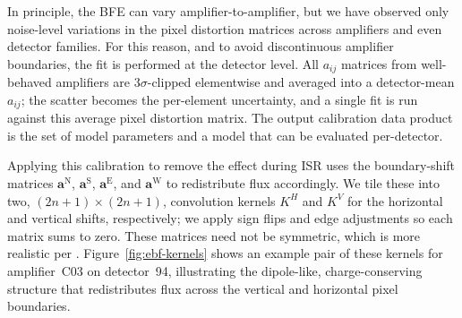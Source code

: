 In principle, the BFE can vary amplifier-to-amplifier, but we have observed only noise-level variations in the pixel distortion matrices across amplifiers and even detector families.
For this reason, and to avoid discontinuous amplifier boundaries, the fit is performed at the detector level.
All $a_{ij}$ matrices from well-behaved amplifiers are 3$\sigma$-clipped elementwise and averaged into a detector-mean $a_{ij}$; the scatter becomes the per-element uncertainty, and a single fit is run against this average pixel distortion matrix.
The output calibration data product is the set of model parameters and a model that can be evaluated per-detector.

Applying this calibration to remove the effect during ISR uses the boundary-shift matrices $\mathbf{a}^{\mathrm{N}}$, $\mathbf{a}^{\mathrm{S}}$, $\mathbf{a}^{\mathrm{E}}$, and $\mathbf{a}^{\mathrm{W}}$ to redistribute flux accordingly.
We tile these into two, $(2n+1)\times(2n+1)$, convolution kernels $K^{H}$ and $K^{V}$ for the horizontal and vertical shifts, respectively; we apply sign flips and edge adjustments so each matrix sums to zero.
These matrices need not be symmetric, which is more realistic per \citet{2024PASP..136d5003B}.
Figure~\ref{fig:ebf-kernels} shows an example pair of these kernels for amplifier~C03 on detector~94, illustrating the dipole-like, charge-conserving structure that redistributes flux across the vertical and horizontal pixel boundaries.

